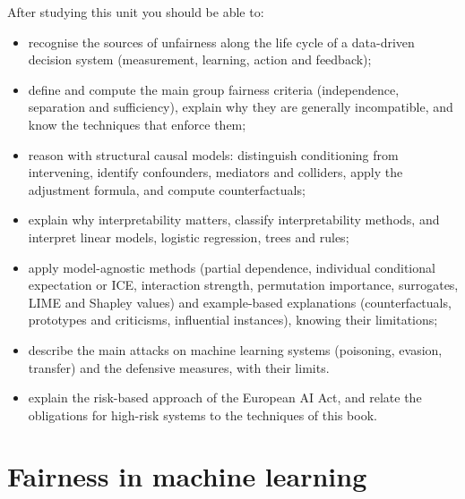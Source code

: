 \begin{objectives}
After studying this unit you should be able to:
\begin{itemize}
  \item recognise the sources of unfairness along the life cycle of a data-driven decision
        system (measurement, learning, action and feedback);
  \item define and compute the main group fairness criteria (independence, separation and
        sufficiency), explain why they are generally incompatible, and know the techniques that
        enforce them;
  \item reason with structural causal models: distinguish conditioning from intervening,
        identify confounders, mediators and colliders, apply the adjustment formula, and compute
        counterfactuals;
  \item explain why interpretability matters, classify interpretability methods, and interpret
        linear models, logistic regression, trees and rules;
  \item apply model-agnostic methods (partial dependence, individual conditional expectation or ICE, interaction strength,
        permutation importance, surrogates, LIME and Shapley values) and example-based
        explanations (counterfactuals, prototypes and criticisms, influential instances),
        knowing their limitations;
  \item describe the main attacks on machine learning systems (poisoning, evasion, transfer)
        and the defensive measures, with their limits.
  \item explain the risk-based approach of the European AI Act, and relate the obligations for high-risk
        systems to the techniques of this book.
\end{itemize}
\end{objectives}

\section{Fairness in machine learning}\label{sec:fairness}


